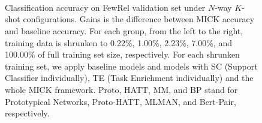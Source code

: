 \begin{figure}[th]
	\centering
	\small
	 \\
	 \\%
	 \\
	
	\centering
	\caption{Classification accuracy on FewRel validation set %
		under $N$-way $K$-shot configurations. Gains is the difference between MICK accuracy and baseline accuracy.
		For each group, from the left to the right, training data is shrunken to 0.22\%, 1.00\%, 2.23\%, 7.00\%, and 100.00\% of full training set size, respectively. For each shrunken training set, we apply baseline models and models with SC (Support Classifier individually), TE (Task Enrichment individually) and the whole MICK framework. Proto, HATT, MM, and BP stand for Prototypical Networks, Proto-HATT, MLMAN, and Bert-Pair, respectively.}
	\label{fig:analysis}
\end{figure}


